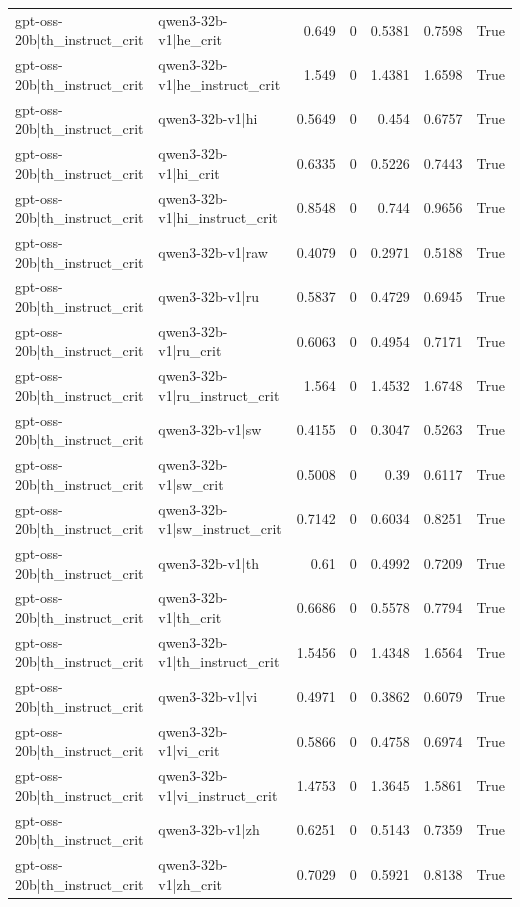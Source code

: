 \begin{table}
\begin{tabular}{l l r r r r l}
gpt-oss-20b|th_instruct_crit & qwen3-32b-v1|he_crit & 0.649 & 0 & 0.5381 & 0.7598 & True \\
gpt-oss-20b|th_instruct_crit & qwen3-32b-v1|he_instruct_crit & 1.549 & 0 & 1.4381 & 1.6598 & True \\
gpt-oss-20b|th_instruct_crit & qwen3-32b-v1|hi & 0.5649 & 0 & 0.454 & 0.6757 & True \\
gpt-oss-20b|th_instruct_crit & qwen3-32b-v1|hi_crit & 0.6335 & 0 & 0.5226 & 0.7443 & True \\
gpt-oss-20b|th_instruct_crit & qwen3-32b-v1|hi_instruct_crit & 0.8548 & 0 & 0.744 & 0.9656 & True \\
gpt-oss-20b|th_instruct_crit & qwen3-32b-v1|raw & 0.4079 & 0 & 0.2971 & 0.5188 & True \\
gpt-oss-20b|th_instruct_crit & qwen3-32b-v1|ru & 0.5837 & 0 & 0.4729 & 0.6945 & True \\
gpt-oss-20b|th_instruct_crit & qwen3-32b-v1|ru_crit & 0.6063 & 0 & 0.4954 & 0.7171 & True \\
gpt-oss-20b|th_instruct_crit & qwen3-32b-v1|ru_instruct_crit & 1.564 & 0 & 1.4532 & 1.6748 & True \\
gpt-oss-20b|th_instruct_crit & qwen3-32b-v1|sw & 0.4155 & 0 & 0.3047 & 0.5263 & True \\
gpt-oss-20b|th_instruct_crit & qwen3-32b-v1|sw_crit & 0.5008 & 0 & 0.39 & 0.6117 & True \\
gpt-oss-20b|th_instruct_crit & qwen3-32b-v1|sw_instruct_crit & 0.7142 & 0 & 0.6034 & 0.8251 & True \\
gpt-oss-20b|th_instruct_crit & qwen3-32b-v1|th & 0.61 & 0 & 0.4992 & 0.7209 & True \\
gpt-oss-20b|th_instruct_crit & qwen3-32b-v1|th_crit & 0.6686 & 0 & 0.5578 & 0.7794 & True \\
gpt-oss-20b|th_instruct_crit & qwen3-32b-v1|th_instruct_crit & 1.5456 & 0 & 1.4348 & 1.6564 & True \\
gpt-oss-20b|th_instruct_crit & qwen3-32b-v1|vi & 0.4971 & 0 & 0.3862 & 0.6079 & True \\
gpt-oss-20b|th_instruct_crit & qwen3-32b-v1|vi_crit & 0.5866 & 0 & 0.4758 & 0.6974 & True \\
gpt-oss-20b|th_instruct_crit & qwen3-32b-v1|vi_instruct_crit & 1.4753 & 0 & 1.3645 & 1.5861 & True \\
gpt-oss-20b|th_instruct_crit & qwen3-32b-v1|zh & 0.6251 & 0 & 0.5143 & 0.7359 & True \\
gpt-oss-20b|th_instruct_crit & qwen3-32b-v1|zh_crit & 0.7029 & 0 & 0.5921 & 0.8138 & True \\

\end{tabular}
\end{table}
